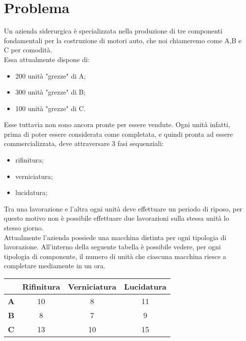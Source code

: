 \documentclass[12pt]{article}
\begin{document}
	

	\newpage
	
	\tableofcontents
	
	\newpage
	
	\section{Problema}
	Un azienda siderurgica è specializzata nella produzione di tre componenti fondamentali per la costruzione di motori auto, che noi chiameremo come A,B e C per comodità.\\
	Essa attualmente dispone di:
	\begin{itemize}
		\item 200 unità "grezze" di A;
		\item 300 unità "grezze" di B;
		\item 100 unità "grezze" di C.
	\end{itemize}
	Esse tuttavia non sono ancora pronte per essere vendute. Ogni unità infatti, prima di poter essere considerata come completata, e quindi pronta ad essere commercializzata, deve attraversare 3 fasi sequenziali:
	\begin{itemize}
		\item rifinitura;
		\item verniciatura;
		\item lucidatura;
	\end{itemize}
	Tra una lavorazione e l'altra ogni unità deve effettuare un periodo di riposo, per questo motivo non è possibile effettuare due lavorazioni sulla stessa unità lo stesso giorno.\\
	Attualmente l'azienda possiede una macchina distinta per ogni tipologia di lavorazione.
	All'interno della seguente tabella è possibile vedere, per ogni tipologia di componente, il numero di unità che ciascuna macchina riesce a completare mediamente in un ora.
	\begin{table}[H]
	\setlength{\tabcolsep}{15pt} %
	\renewcommand{\arraystretch}{2} %
		\begin{center}
			\begin{tabular}{|c|c|c|c|}
				\hline
				& \textbf{Rifinitura} & \textbf{Verniciatura} & \textbf{Lucidatura} \\ \hline
				\textbf{A} &      10      &      8      &    11        \\ \hline
				\textbf{B} &       8     &       7     &      9      \\ \hline
				\textbf{C} &        13    &      10      &    15       \\ \hline
			\end{tabular}
		\end{center}
	\end{table}
\end{document}
